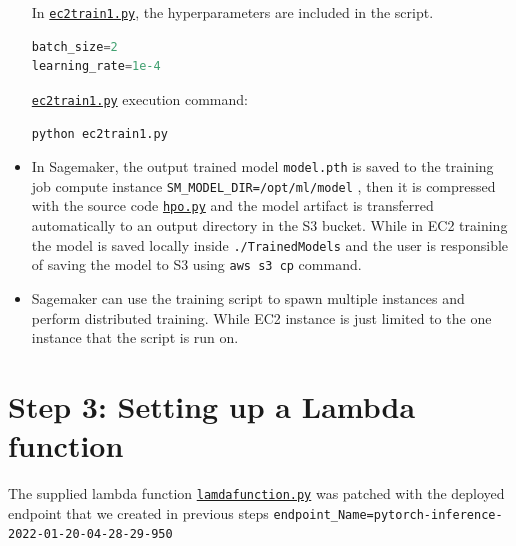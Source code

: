 \documentclass[a4paper
]{article}
\begin{document}
\begin{itemize}
In \href{https://github.com/FadyMorris/udacity-AWS-ml-engineer-nanodegree/tree/main/projects/04_operationalizing-an-aws-ml-project/ec2train1.py}{\texttt{ec2train1.py}}, the hyperparameters are
included in the script.

\begin{lstlisting}[language=Python]
batch_size=2
learning_rate=1e-4
\end{lstlisting}

\href{https://github.com/FadyMorris/udacity-AWS-ml-engineer-nanodegree/tree/main/projects/04_operationalizing-an-aws-ml-project/ec2train1.py}{\texttt{ec2train1.py}} execution command:

\begin{lstlisting}[language=bash]
python ec2train1.py
\end{lstlisting}

\item
  In Sagemaker, the output trained model \texttt{model.pth} is saved to
  the training job compute instance \linebreak
  \texttt{SM\_MODEL\_DIR=/opt/ml/model} , then it is compressed with the
  source code \href{https://github.com/FadyMorris/udacity-AWS-ml-engineer-nanodegree/tree/main/projects/04_operationalizing-an-aws-ml-project/hpo.py}{\texttt{hpo.py}} and the model artifact is
  transferred automatically to an output directory in the S3 bucket.
  While in EC2 training the model is saved locally inside
  \texttt{./TrainedModels} and the user is responsible of saving the
  model to S3 using \colorbox{gray!10}{\lstinline{aws s3 cp}} command.
\item
  Sagemaker can use the training script to spawn multiple instances and
  perform distributed training. While EC2 instance is just limited to
  the one instance that the script is run on.
\end{itemize}

\hypertarget{step-3-setting-up-a-lambda-function}{%
\section{Step 3: Setting up a Lambda
function}\label{step-3-setting-up-a-lambda-function}}

The supplied lambda function
\href{https://github.com/FadyMorris/udacity-AWS-ml-engineer-nanodegree/tree/main/projects/04_operationalizing-an-aws-ml-project/lamdafunction.py}{\texttt{lamdafunction.py}} was patched with the
deployed endpoint that we created in previous steps
\texttt{endpoint\_Name=\textquotesingle{}pytorch-inference-2022-01-20-04-28-29-950\textquotesingle{}}
\end{document}
